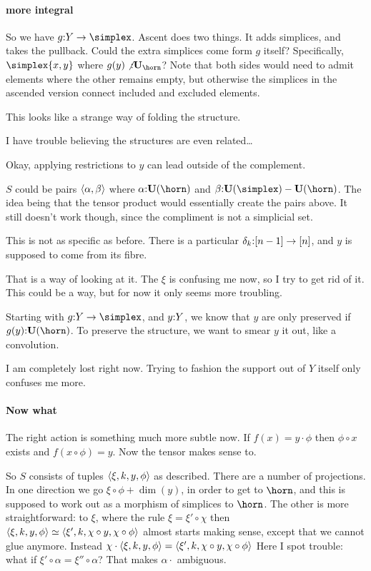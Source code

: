 \documentclass[csh.tex]{subfiles}
\begin{document}
\paragraph{more integral}
So we have $g\of Y\to\simplex$. Ascent does two things. It adds simplices, and takes the pullback. Could the extra simplices come form $g$ itself? Specifically, $\simplex{x,y}$ where $g(y)\not\of\base_{\horn}$? Note that both sides would need to admit elements where the other remains empty, but otherwise the simplices in the ascended version connect included and excluded elements.

This looks like a strange way of folding the structure.

I have trouble believing the structures are even related\dots

Okay, applying restrictions to $y$ can lead outside of the complement.

$S$ could be pairs $\left\langle \alpha,\beta \right\rangle$ where $\alpha\of\base(\horn)$ and $\beta \of \base(\simplex)-\base(\horn)$. The idea being that the tensor product would essentially create the pairs above.
It still doesn't work though, since the compliment is not a simplicial set.

This is not as specific as before. There is a particular $\delta_k\mathord :[n-1]\to[n]$, and $y$ is supposed to come from its fibre.

That is a way of looking at it.
The $\xi$ is confusing me now, so I try to get rid of it. This could be a way, but for now it only seems more troubling.

Starting with $g\of Y\to \simplex$, and $y\mathord : Y$, we know that $y$ are only preserved if $g(y)\of\base(\horn)$. To preserve the structure, we want to smear $y$ it out, like a convolution.

I am completely lost right now. Trying to fashion the support out of $Y$ itself only confuses me more.

\paragraph{Now what}
The right action is something much more subtle now.
If $f(x) = y\cdot \phi$ then $\phi\circ x$ exists and $f(x\circ \phi) = y$. Now the tensor makes sense to.

So $S$ consists of tuples $\left\langle \xi,k,y,\phi \right\rangle$ as described. There are a number of projections. In one direction we go $\xi\circ \phi + \dim(y)$, in order to get to $\horn$, and this is supposed to work out as a morphism of simplices to $\horn$. The other is more straightforward: to $\xi$, where the rule $\xi = \xi'\circ \chi$ then $\left\langle \xi,k,y,\phi \right\rangle\simeq \left\langle \xi',k,\chi\circ y,\chi\circ \phi \right\rangle$ almost starts making sense, except that we cannot glue anymore. Instead
$\chi\cdot\left\langle \xi,k,y,\phi \right\rangle = \left\langle \xi',k,\chi\circ y,\chi\circ \phi \right\rangle$
Here I spot trouble: what if $\xi'\circ\alpha = \xi''\circ \alpha$?
That makes $\alpha\cdot$ ambiguous.
\end{document}
